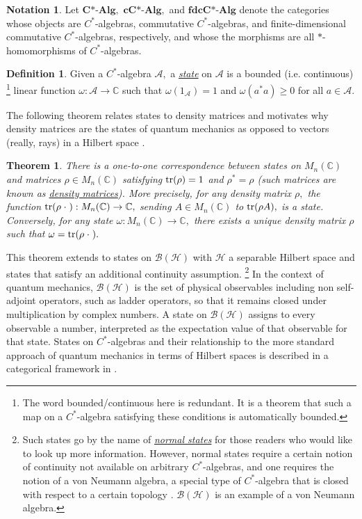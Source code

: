 \documentclass[12pt]{article}
\theoremstyle{theorem}
\newtheorem{theorem}[equation]{Theorem}
\theoremstyle{definition}
\newtheorem{definition}[equation]{Definition}
\newtheorem{notation}[equation]{Notation}
\numberwithin{equation}{section}
\let\w=\omega      \let\G=\Gamma \let\D=\Delta \let\Q=\Theta \let\L=\Lambda
\let\C=\Chi \let\W=\Omega
\newcommand{\bt}{\begin{theorem}}
\newcommand{\et}{\end{theorem}}
\newcommand{\bd}{\begin{definition}}
\newcommand{\ed}{\end{definition}}
\newcommand{\<}{\langle}
\renewcommand{\>}{\rangle}
\newcommand{\tr}{{\rm tr} }
\def\C{{{\mathbb C}}}
\def\Q{{{\mathbb Q}}}
\def\Hi{{{\mathcal{H}}}}
\newcommand{\CAlg}{\mathbf{C\text{*-}Alg}}
\newcommand{\cCAlg}{\mathbf{cC\text{*-}Alg}}
\newcommand{\fdcCAlg}{\mathbf{fdcC\text{*-}Alg}}
\def\mA{{{\mathcal{A}}}}
\def\mB{{{\mathcal{B}}}}
\begin{document}
\begin{notation}
\label{defn:CAlg}
Let $\CAlg,$ $\cCAlg,$ and $\fdcCAlg$ denote the categories whose 
objects are $C^*$-algebras, commutative $C^*$-algebras, 
and finite-dimensional commutative $C^*$-algebras, respectively, 
and whose the morphisms are all $*$-homomorphisms of $C^*$-algebras. 
\end{notation}

\bd
\label{defn:state}
Given a $C^*$-algebra $\mA,$ 
a \emph{\uline{state}} on $\mA$ is a
bounded (i.e. continuous)%
\footnote{The word bounded/continuous here is redundant. 
It is a theorem that such a map on a $C^*$-algebra satisfying these
conditions is automatically bounded.}
linear function ${\w:\mA\to\C}$ such that
$\w(1_{\mA})=1$ and $\w(a^*a)\ge0$ for all $a\in\mA.$
\ed

The following theorem relates states to density matrices and motivates
why density matrices are the states of quantum mechanics 
as opposed to vectors (really, rays) in a Hilbert space \cite{Ha13}.

\bt
\label{thm:statesdensitymatrices}
There is a one-to-one correspondence between 
states on $M_{n}(\C)$ and matrices $\rho\in M_{n}(\C)$
satisfying $\tr(\rho)=1$ and $\rho^*=\rho$
(such matrices are known as \emph{\uline{density matrices}}). 
More precisely, for any density matrix $\rho,$ the function 
$\tr(\rho\;\cdot\;):M_{n}(\C)\to\C,$ sending $A\in M_{n}(\C)$ to
$\tr(\rho A),$ is a state. Conversely, for
any state $\w:M_{n}(\C)\to\C,$ there exists a unique density matrix
$\rho$ such that $\w=\tr(\rho\;\cdot\;).$ 
\et

This theorem extends to states on $\mB(\Hi)$ with $\Hi$ a separable
Hilbert space
and states that satisfy an additional continuity assumption.%
\footnote{
Such states go by the name of \emph{\uline{normal states}} for those readers 
who would like to look up more information. However, normal states
require a certain notion of continuity not available on arbitrary 
$C^*$-algebras, and one requires the notion of a von Neumann algebra, 
a special type of $C^*$-algebra that is closed with respect to a certain topology
\cite{ReSu07}.
$\mB(\Hi)$ is an example of a von Neumann algebra. 
}
In the context of quantum mechanics, $\mB(\Hi)$ is the set of
physical observables including non self-adjoint operators, 
such as ladder operators, so that it remains closed under 
multiplication by complex numbers. 
A state on $\mB(\Hi)$ assigns to every observable a number, 
interpreted as the expectation value of that observable
for that state.
States on $C^*$-algebras and their relationship to the more standard
approach of quantum mechanics in terms of Hilbert spaces is 
described in a categorical framework in \cite{Pa16}. 
\end{document}
